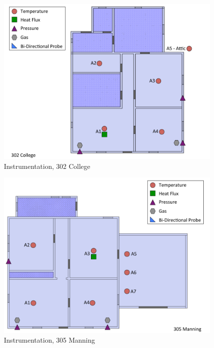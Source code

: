 \documentclass[12pt,oneside]{book}
\begin{document}
\begin{figure}[!ht]
\includegraphics[width=6in]{../Figures/Instrumentation/302_College}
\caption{Instrumentation, 302 College}
\label{fig:Instrumentation_302_College}
\end{figure}

\begin{figure}[!ht]
\includegraphics[width=6in]{../Figures/Instrumentation/305_Manning}
\caption{Instrumentation, 305 Manning}
\label{fig:Instrumentation_305_Manning}
\end{figure}
\end{document}
